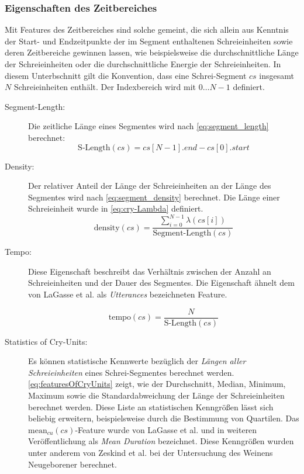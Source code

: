 \subsubsection{Eigenschaften des Zeitbereiches}

Mit Features des Zeitbereiches sind solche gemeint, die sich allein aus Kenntnis der Start- und Endzeitpunkte der im Segment enthaltenen Schreieinheiten sowie deren Zeitbereiche gewinnen lassen, wie beispielsweise die durchschnittliche Länge der Schreieinheiten oder die durchschnittliche Energie der Schreieinheiten.\cite[S. 16 - 17]{cry_thesis} In diesem Unterbschnitt gilt die Konvention, dass eine Schrei-Segment $cs$ insgesamt $N$ Schreieinheiten enthält. Der Indexbereich wird mit $0 \ldots N-1$ definiert.

\begin{description}
\item[Segment-Length: ] Die zeitliche Länge eines Segmentes wird nach \autoref{eq:segment_length} berechnet:
\begin{equation}
\text{S-Length}(cs) = cs[N-1].end - cs[0].start
\label{eq:segment_length}
\end{equation}

\item[Density: ] Der relativer Anteil der Länge der Schreieinheiten an der Länge des Segmentes wird nach \autoref{eq:segment_density} berechnet. Die Länge einer Schreieinheit wurde in \autoref{eq:cry-Lambda} definiert.
\begin{equation}
\text{density}(cs) = \frac{\sum_{i = 0}^{N-1} \lambda(cs[i])}{\text{Segment-Length}(cs)}
\label{eq:segment_density}
\end{equation}

\item[Tempo:] Diese Eigenschaft beschreibt das Verhältnis zwischen der Anzahl an Schreieinheiten und der Dauer des Segmentes. Die Eigenschaft ähnelt dem von LaGasse et al. \cite[S. 85]{parentalPerception} als \emph{Utterances} bezeichneten Feature.

\begin{equation}
\text{tempo}(cs) =  \frac{N}{\text{S-Length}(cs)}
\end{equation}

\item[Statistics of Cry-Units:] Es können statistische Kennwerte bezüglich der \emph{Längen aller Schreieinheiten} eines Schrei-Segmentes berechnet werden. \autoref{eq:featuresOfCryUnits} zeigt, wie der Durchschnitt, Median, Minimum, Maximum sowie die Standardabweichung der Länge der Schreieinheiten berechnet werden. Diese Liste an statistischen Kenngrößen lässt sich beliebig erweitern, beispielsweise durch die Bestimmung von Quartilen. Das $\text{mean}_{cu}(cs)$-Feature wurde von LaGasse et al. \cite[S. 85]{parentalPerception} und in weiteren Veröffentlichung als \emph{Mean Duration} bezeichnet. Diese Kenngrößen wurden unter anderem von Zeskind et al. \cite{rythmic} bei der Untersuchung des Weinens Neugeborener berechnet.


\end{description}
